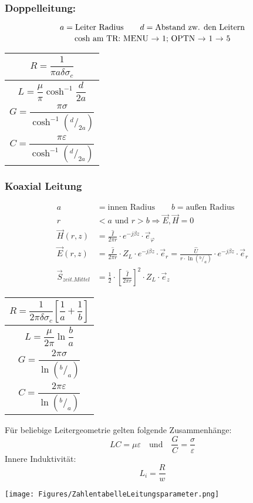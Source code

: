 \subsubsection{Doppelleitung:}
{\small\[
        a = \text{Leiter Radius} \qquad d = \text{Abstand zw. den Leitern}\\
    \]}
{\small\[
        \text{cosh am TR: MENU $\rightarrow$ 1; OPTN $\rightarrow$ 1 $\rightarrow$ 5}\\
    \]}

{\renewcommand*{\arraystretch}{0.2}
    \begin{tabularx}{0.5\columnwidth}{|X|}
        \hline
        \[R  = \frac{1}{\pi a\delta\sigma_c}\]              \\
        \hline
        \[L = \frac{\mu}{\pi} \cosh^{-1}\frac{d}{2a}\]      \\
        \hline
        \[G = \frac{\pi\sigma}{\cosh^{-1}(^d/_{2a})}\]      \\
        \hline
        \[C = \frac{\pi\varepsilon}{\cosh^{-1}(^d/_{2a})}\] \\
        \hline
    \end{tabularx}}

\subsubsection{Koaxial Leitung}
\begin{align*}
    a                     & = \text{innen Radius} \qquad b = \text{außen Radius} \\
    r                     &< a \text{ und } r > b \Rightarrow \vec{E}, \vec{H} = 0 \\
    \vec{H}(r, z)         & = \frac{\hat{I}}{2\pi r}\cdot e^{-j\beta z}\cdot\vec{e}_\varphi                   \\
    \vec{E}(r, z)         & = \frac{\hat{I}}{2\pi r}\cdot Z_{L}\cdot e^{-j\beta z} \cdot\vec{e}_r = \frac{\hat{U}}{r \cdot\ln{(^{b}/_{a})}}\cdot e^{-j\beta z}\cdot\vec{e}_r        \\
    \vec{S}_{zeit.Mittel} & = \frac{1}{2}\cdot\left[\frac{\hat{I}}{2\pi r}\right]^2\cdot Z_{L}\cdot\vec{e}_z
\end{align*}

{\renewcommand*{\arraystretch}{0.2}
    \begin{tabularx}{0.5\columnwidth}{|X|}
        \hline
        \[R=\frac{1}{2\pi\delta\sigma_c}\left[\frac{1}{a}+\frac{1}{b}\right]\] \\
        \hline
        \[L=\frac{\mu}{2\pi}\ln\frac{b}{a}\]                                   \\
        \hline
        \[G=\frac{2\pi\sigma}{\ln(^b/_a)}\]                                    \\
        \hline
        \[C=\frac{2\pi\varepsilon}{\ln(^b/_a)}\]                               \\
        \hline
    \end{tabularx}}



\vspace{1ex}
Für beliebige Leitergeometrie gelten folgende Zusammenhänge:
\[
    LC = \mu\varepsilon \quad \text{und} \quad \frac{G}{C} = \frac{\sigma}{\varepsilon}
\]
Innere Induktivität:
\[
    L_i = \frac{R}{w}
\]

\texttt{[image: Figures/ZahlentabelleLeitungsparameter.png]}